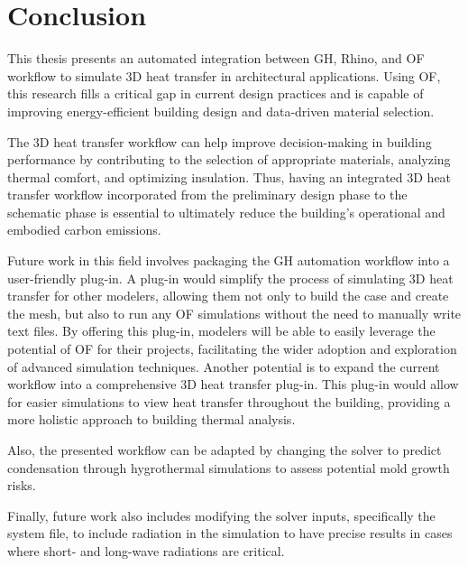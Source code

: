 \chapter{Conclusion}
This thesis presents an automated integration between  \gls{GH}, Rhino, and \gls{OF} workflow to simulate 3D heat transfer in architectural applications. 
Using OF, this research fills a critical gap in current design practices and is capable of improving energy-efficient building design and data-driven material selection. 

The 3D heat transfer workflow can help improve decision-making in building performance by contributing to the selection of appropriate materials, analyzing thermal comfort, and optimizing insulation.
Thus, having an integrated 3D heat transfer workflow incorporated from the preliminary design phase to the schematic phase is essential to ultimately reduce the building's operational and embodied carbon emissions. 

Future work in this field involves packaging the \gls{GH} automation workflow into a user-friendly plug-in. 
A plug-in would simplify the process of simulating 3D heat transfer for other modelers, allowing them not only to build the case and create the mesh, but also to run any \gls{OF} simulations without the need to manually write text files. 
By offering this plug-in, modelers will be able to easily leverage the potential of \gls{OF} for their projects, facilitating the wider adoption and exploration of advanced simulation techniques. 
Another potential is to expand the current workflow into a comprehensive 3D heat transfer plug-in. 
This plug-in would allow for easier simulations to view heat transfer throughout the building, providing a more holistic approach to building thermal analysis. 

 Also, the presented workflow can be adapted by changing the solver to predict condensation through hygrothermal simulations to assess potential mold growth risks.

Finally, future work also includes modifying the solver inputs, specifically the system file, to include radiation in the simulation to have precise results in cases where short- and long-wave radiations are critical. 







